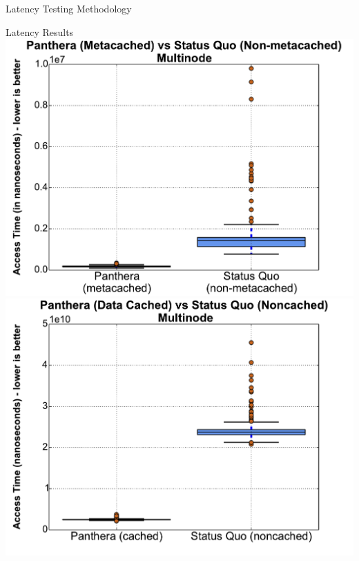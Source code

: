 \documentclass[final]{beamer} %
\begin{document}
\begin{frame}
\begin{columns}[t]
\begin{column}{0.32\textwidth}
\begin{block}{Latency Testing Methodology}
	\end{block}
		\begin{block}{Latency Results}
		\vspace{1em}
		\includegraphics[scale=1]{assets/v2/multinode_meta_box_plot.pdf}
		\vspace{1.5em}
		\includegraphics[scale=0.98]{assets/v2/getter_boxplot.pdf}
	\end{block}
	

\end{column}
\end{columns}
\end{frame}
\end{document}
